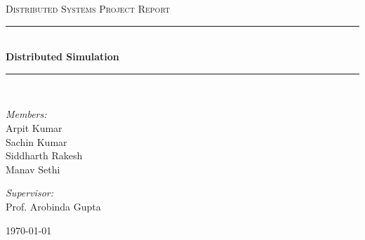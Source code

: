 \documentclass[12pt,a4paper]{article}
\newcommand{\HRule}{\rule{\linewidth}{0.5mm}}
\begin{document}


\begin{titlepage}
\begin{center}



\textsc{\Large Distributed Systems Project Report }\\[0.5cm]

\HRule \\[0.4cm]
{ \huge \bfseries Distributed Simulation \\[0.4cm] }

\HRule \\[1.5cm]

\begin{minipage}{0.4\textwidth}
\begin{flushleft} \large
\emph{Members:}\\
Arpit Kumar\\
Sachin Kumar\\
Siddharth Rakesh\\
Manav Sethi\\
\end{flushleft}
\end{minipage}
\begin{minipage}{0.4\textwidth}
\begin{flushright} \large
\emph{Supervisor:} \\
Prof. Arobinda Gupta
\end{flushright}
\end{minipage}

\vfill

{\large \today}

\end{center}
\end{titlepage}

\tableofcontents
\newpage
\end{document}
